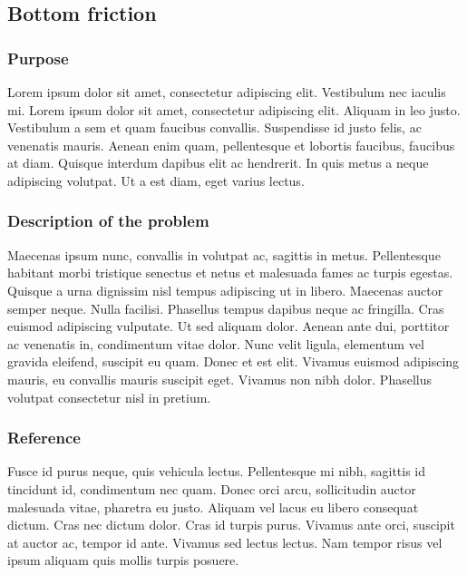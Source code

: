 \subsection{Bottom friction}
%

%    
\subsubsection{Purpose}
%

Lorem ipsum dolor sit amet, consectetur adipiscing elit. Vestibulum nec
iaculis mi. Lorem ipsum dolor sit amet, consectetur adipiscing elit. Aliquam
in leo justo. Vestibulum a sem et quam faucibus convallis. Suspendisse id
justo felis, ac venenatis mauris. Aenean enim quam, pellentesque et lobortis
faucibus, faucibus at diam. Quisque interdum dapibus elit ac hendrerit. In
quis metus a neque adipiscing volutpat. Ut a est diam, eget varius lectus.
%
\subsubsection{Description of the problem}
%
Maecenas ipsum nunc, convallis in volutpat ac, sagittis in metus. Pellentesque
habitant morbi tristique senectus et netus et malesuada fames ac turpis
egestas. Quisque a urna dignissim nisl tempus adipiscing ut in libero.
Maecenas auctor semper neque. Nulla facilisi. Phasellus tempus dapibus neque
ac fringilla. Cras euismod adipiscing vulputate. Ut sed aliquam dolor. Aenean
ante dui, porttitor ac venenatis in, condimentum vitae dolor. Nunc velit
ligula, elementum vel gravida eleifend, suscipit eu quam. Donec et est elit.
Vivamus euismod adipiscing mauris, eu convallis mauris suscipit eget. Vivamus
non nibh dolor. Phasellus volutpat consectetur nisl in pretium.
%    
%
\subsubsection{Reference}
%
Fusce id purus neque, quis vehicula lectus. Pellentesque mi nibh, sagittis id
tincidunt id, condimentum nec quam. Donec orci arcu, sollicitudin auctor
malesuada vitae, pharetra eu justo. Aliquam vel lacus eu libero consequat
dictum. Cras nec dictum dolor. Cras id turpis purus. Vivamus ante orci,
suscipit at auctor ac, tempor id ante. Vivamus sed lectus lectus. Nam tempor
risus vel ipsum aliquam quis mollis turpis posuere.
%
%

